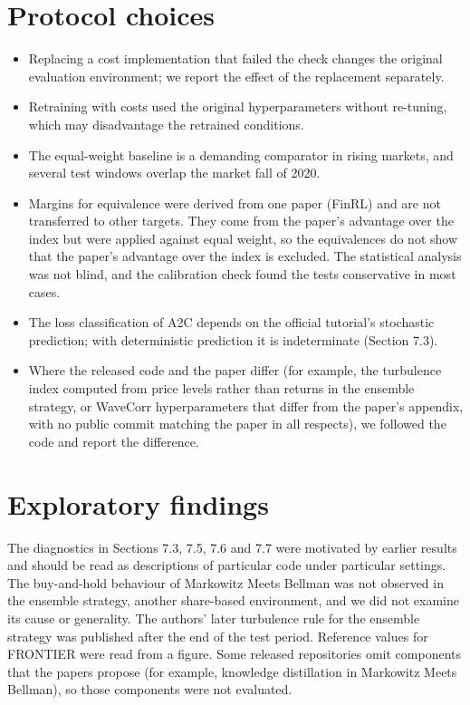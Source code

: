 \documentclass[12pt,a4paper]{report}
\providecommand{\tightlist}{\setlength{\itemsep}{0pt}\setlength{\parskip}{0pt}}
\begin{document}
\section{Protocol choices}\label{protocol-choices}

\begin{itemize}
\tightlist
\item
  Replacing a cost implementation that failed the check changes the
  original evaluation environment; we report the effect of the
  replacement separately.
\item
  Retraining with costs used the original hyperparameters without
  re-tuning, which may disadvantage the retrained conditions.
\item
  The equal-weight baseline is a demanding comparator in rising markets,
  and several test windows overlap the market fall of 2020.
\item
  Margins for equivalence were derived from one paper (FinRL) and are
  not transferred to other targets. They come from the paper's advantage
  over the index but were applied against equal weight, so the
  equivalences do not show that the paper's advantage over the index is
  excluded. The statistical analysis was not blind, and the calibration
  check found the tests conservative in most cases.
\item
  The loss classification of A2C depends on the official tutorial's
  stochastic prediction; with deterministic prediction it is
  indeterminate (Section 7.3).
\item
  Where the released code and the paper differ (for example, the
  turbulence index computed from price levels rather than returns in the
  ensemble strategy, or WaveCorr hyperparameters that differ from the
  paper's appendix, with no public commit matching the paper in all
  respects), we followed the code and report the difference.
\end{itemize}

\section{Exploratory findings}\label{exploratory-findings}

The diagnostics in Sections 7.3, 7.5, 7.6 and 7.7 were motivated by
earlier results and should be read as descriptions of particular code
under particular settings. The buy-and-hold behaviour of Markowitz Meets
Bellman was not observed in the ensemble strategy, another share-based
environment, and we did not examine its cause or generality. The
authors' later turbulence rule for the ensemble strategy was published
after the end of the test period. Reference values for FRONTIER were
read from a figure. Some released repositories omit components that the
papers propose (for example, knowledge distillation in Markowitz Meets
Bellman), so those components were not evaluated.
\end{document}
